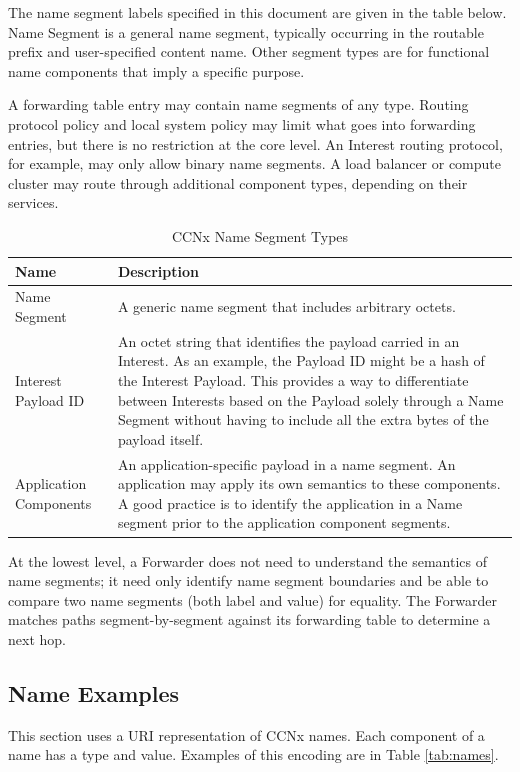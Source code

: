 \documentclass[12pt]{article}
\begin{document}
The name segment labels specified in this document are given in the
table below.  Name Segment is a general name segment, typically
occurring in the routable prefix and user-specified content name.
Other segment types are for functional name components that imply a
specific purpose.

A forwarding table entry may contain name segments of any type.
Routing protocol policy and local system policy may limit what goes
into forwarding entries, but there is no restriction at the core
level.  An Interest routing protocol, for example, may only allow
binary name segments.  A load balancer or compute cluster may route
through additional component types, depending on their services.

\begin{table}[t!]
\center
\caption{CCNx Name Segment Types}
\begin{tabular}{|p{5cm}|p{9cm}|} \hline
{\bf Name} & {\bf Description} \\ \hline
Name Segment & A generic name segment that includes arbitrary octets. \\
Interest Payload ID & An octet string that identifies the payload carried in an Interest. As an example, the Payload ID might be a hash of the Interest Payload.
This provides a way to differentiate between Interests based on the Payload solely through a Name Segment without having to include all the extra bytes of the payload itself. \\
Application Components &  An application-specific payload in a name segment. An application may apply its own semantics to these components. A good practice is to identify the
application in a Name segment prior to the application component segments. \\ \hline
\end{tabular}
\end{table}

At the lowest level, a Forwarder does not need to understand the
semantics of name segments; it need only identify name segment
boundaries and be able to compare two name segments (both label and
value) for equality.  The Forwarder matches paths segment-by-segment
against its forwarding table to determine a next hop.

\subsection{Name Examples}
This section uses a URI representation of CCNx names. Each component of a name has
a type and value. Examples of this encoding are in Table \ref{tab:names}.
\end{document}
